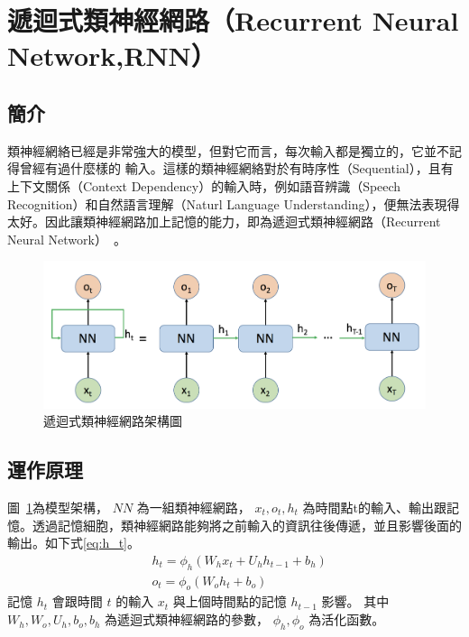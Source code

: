 \begin{itemize}
\end{itemize}
\section{遞迴式類神經網路（Recurrent Neural Network,RNN）}
\subsection{簡介}
類神經網絡已經是非常強大的模型，但對它而言，每次輸入都是獨立的，它並不記得曾經有過什麼樣的
輸入。這樣的類神經網絡對於有時序性（Sequential），且有上下文關係（Context
Dependency）的輸入時，例如語音辨識（Speech
Recognition）和自然語言理解（Naturl
Language Understanding），便無法表現得太好。因此讓類神經網路加上記憶的能力，即為遞迴式類神經網路（Recurrent
Neural Network）~\cite{elman1990finding}。

\begin{figure}[h]
\centering
\includegraphics[scale=0.5]{images/ch2_RNN.png}
\caption{遞迴式類神經網路架構圖} \label{fig:ch2_RNN}
\end{figure}
\subsection{運作原理}
	圖~\ref{fig:ch2_RNN}為模型架構， $ NN $ 為一組類神經網路， $ x_t,o_t,h_t $ 為時間點t的輸入、輸出跟記憶。透過記憶細胞，類神經網路能夠將之前輸入的資訊往後傳遞，並且影響後面的輸出。如下式\ref{eq:h_t}。
\begin{equation}
\label{eq:h_t}
\begin{aligned}
&h_t = \phi_h{(W_h x_t+U_h h_{t-1}+b_h)}
\\
&o_t = \phi_o{(W_o h_t+b_o)}
\end{aligned}
\end{equation}
記憶 $ h_t $ 會跟時間  $ t $  的輸入  $ x_t $  與上個時間點的記憶  $ h_{t-1} $  影響。
其中 $ W_h,W_o,U_h,b_o,b_h $ 為遞迴式類神經網路的參數， $ \phi_h,\phi_o $ 為活化函數。



